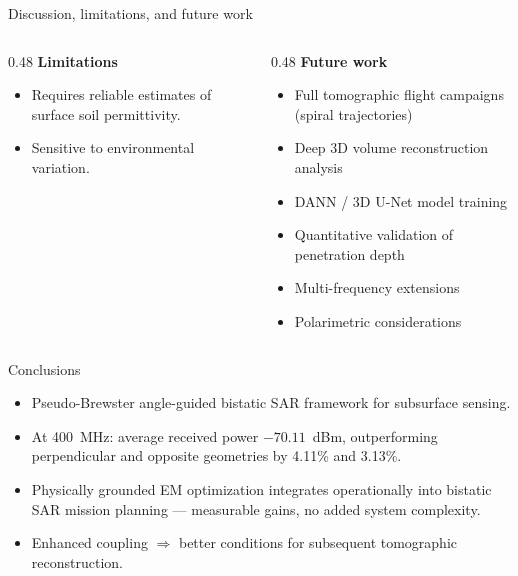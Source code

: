 \documentclass[9pt,aspectratio=169]{beamer}
\begin{document}
\begin{frame}{Discussion, limitations, and future work}
  \begin{columns}[T,onlytextwidth]
    \begin{column}{0.48\textwidth}
      \textbf{Limitations}
      \begin{itemize}
        \item Requires reliable estimates of surface soil permittivity.
        \item Sensitive to environmental variation.
      \end{itemize}
    \end{column}
    \begin{column}{0.48\textwidth}
      \textbf{Future work}
      \begin{itemize}
        \footnotesize
        \item Full tomographic flight campaigns (spiral trajectories)
        \item Deep 3D volume reconstruction analysis
        \item DANN / 3D U-Net model training
        \item Quantitative validation of penetration depth
        \item Multi-frequency extensions
        \item Polarimetric considerations
      \end{itemize}
    \end{column}
  \end{columns}
\end{frame}

\begin{frame}{Conclusions}
  \begin{itemize}
    \item Pseudo-Brewster angle-guided bistatic SAR framework for subsurface sensing.
    \item At \SI{400}{\mega\hertz}: average received power $-70.11$~dBm, outperforming perpendicular and opposite geometries by \alert{4.11\%} and \alert{3.13\%}.
    \item Physically grounded EM optimization integrates operationally into bistatic SAR mission planning --- measurable gains, \alert{no added system complexity}.
    \item Enhanced coupling $\Rightarrow$ better conditions for subsequent tomographic reconstruction.
  \end{itemize}
\end{frame}
\end{document}
